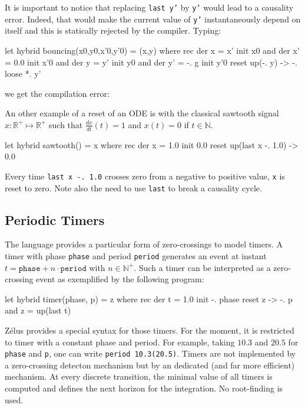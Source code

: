 \documentclass[11pt,titlepage,twoside]{report}
\makeatletter
\newcommand{\zls}[1]{{\@span{class="zelusinline"}#1}}
\newcommand{\zls}[1]{\texttt{#1}}
\renewcommand{\zls}[1]{\texttt{#1}}
\newcommand{\zelus}{{\sf Z\'elus}}
\newcommand{\DotNotation}[1]{\frac{\mathit{d}{#1}}{\mathit{dt}}}
\newcommand{\bR}{\mathbb{R}}
\newcommand{\bN}{\mathbb{N}}
\newcommand{\Marc}[1]{{\bf Marc.} {#1} {\bf Fin}}
\makeatother
\begin{document}
It is important to notice that replacing \zls{last y'} by
\zls{y'} would lead to a causality error. Indeed, that would make
the current value of \zls{y'} instantaneously depend on itself and
this is statically rejected by the compiler. Typing:
\begin{chklisting}[include=gravity,fail]
let hybrid bouncing(x0,y0,x'0,y'0) = (x,y) where
 rec der x = x' init x0
 and der x' = 0.0 init x'0
 and der y = y' init y0
 and der y' = -. g init y'0 reset up(-. y) -> -. loose *. y'
\end{chklisting}
we get the compilation error:
\chklistingerr{}


An other example of a reset of an ODE is with the classical sawtooth
signal $x: \bR^+ \mapsto \bR^+$ such that $\DotNotation{x}(t) = 1$ and
$x(t) = 0$ if $t\in\bN$.
\begin{chklisting}[withresult]
let hybrid sawtooth() = x where
  rec der x = 1.0 init 0.0 reset up(last x -. 1.0) -> 0.0
\end{chklisting}
%
Every time \zls{last x -. 1.0} crosses zero from a negative to positive 
value,
\zls{x} is reset to zero. Note also the need to use \zls{last} to break
a causality cycle.

\subsection{Periodic Timers\label{periodictimers}} %

The language provides a particular form of zero-crossings to model
timers. A timer with phase \zls{phase} and period \zls{period} generates
an event at instant $t = \mathtt{phase} + n \cdot \mathtt{period}$ with
$n \in \bN^+$. Such a timer can be interpreted as a zero-crossing event as
exemplified by the following program:
\begin{chklisting}[withresult]
let hybrid timer(phase, p) = z where
  rec der t = 1.0 init -. phase reset z -> -. p
  and z = up(last t)
\end{chklisting}

\zelus{} provides a special syntax for those timers. For the moment,
it is restricted to timer with a constant phase and period. For example,
taking $10.3$ and $20.5$ for \zls{phase} and \zls{p}, one can
write \zls{period 10.3(20.5)}. Timers are not implemented by a zero-crossing 
detecton mechanism
but by an dedicated (and far more efficient) mechanism. At every discrete transition,
the minimal value of all timers is computed and defines the next horizon for the
integration. No root-finding is used.
\end{document}

